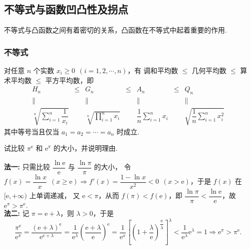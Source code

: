 \subsection{不等式与函数凹凸性及拐点}

不等式与凸函数之间有着密切的关系，凸函数在不等式中起着重要的作用.

\subsubsection{不等式}

\begin{theorem}[均值不等式]
    对任意 $n$ 个实数 $x_i\geqslant 0~~(i=1,2,\cdots,n)$，有\label{meanInequality}
    调和平均数 $\leqslant$ 几何平均数 $\leqslant$ 算术平均数 $\leqslant$ 平方平均数，即
    $$\begin{matrix}
            H_n                                                    & \leqslant & G_n                                                    & \leqslant & A_n       & \leqslant & Q_n       \\
            \parallel                                              &           & \parallel                                              &           & \parallel &           & \parallel \\
            \sqrt[n]{\displaystyle \sum_{i=1}^{n}\dfrac{1}{x_i}  } &           & \sqrt[n]{\displaystyle \prod _{i=1}^n x_i}             &           &
            \displaystyle \dfrac{1}{n}\sum_{i=1}^{n}x_i            &           & \sqrt{\displaystyle \dfrac{1}{n}\sum_{i=1}^{n}x_i^2  }
        \end{matrix}$$
    其中等号当且仅当 $a_1=a_2=\cdots=a_n$ 时成立.
\end{theorem}

\begin{example}
    试比较 $\pi^{\mathrm{e}}$ 和 $\mathrm{e}^\pi$ 的大小，并说明理由.
\end{example}
\begin{solution}
    \textbf{法一: }只需比较 $\dfrac{\ln \mathrm{e}}{\mathrm{e}}$ 与 $\dfrac{\ln\pi}{\pi}$ 的大小，
    令 $f(x)=\dfrac{\ln x}{x}~~(x\geqslant \mathrm{e})\Rightarrow f'(x)=\dfrac{1-\ln x}{x^2}<0~~(x>\mathrm{e})$，于是 $f(x)$ 在 $[\mathrm{e},+\infty)$ 上单调递减，
    又 $\mathrm{e}<\pi$，从而 $f(\pi)<f(\mathrm{e})$，即 $\dfrac{\ln\pi}{\pi}<\dfrac{\ln \mathrm{e}}{\mathrm{e}}$，故 $\mathrm{e}^\pi>\pi^{\mathrm{e}}.$\\
    \textbf{法二: }记 $\pi=\mathrm{e}+\lambda$，则 $\lambda>0$，于是
    $$\dfrac{\pi ^{\mathrm{e}}}{\mathrm{e}^{\pi }}=\dfrac{\left( \mathrm{e}+\lambda \right) ^{\mathrm{e}}}{\mathrm{e}^{\mathrm{e}+\lambda }}=\dfrac{1}{\mathrm{e}^{\lambda }}\left( \dfrac{\mathrm{e}+\lambda }{\mathrm{e}}\right) ^{\mathrm{e}}=\dfrac{1}{\mathrm{e}^{x}}\left[ \left( 1+\dfrac{\lambda }{\mathrm{e}}\right) ^{\dfrac{\mathrm{e}}{\lambda }}\right] ^{\lambda } <\dfrac{1}{\mathrm{e}^{\lambda }}\mathrm{e}^{\lambda }=1\Rightarrow\mathrm{e}^\pi>\pi^{\mathrm{e}}.$$
\end{solution}

